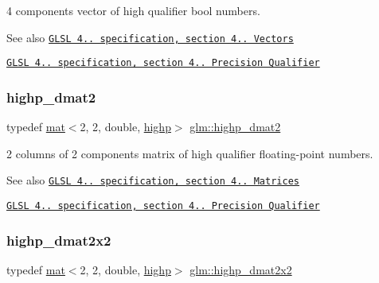 4 components vector of high qualifier bool numbers.

\begin{DoxySeeAlso}{See also}
\href{http://www.opengl.org/registry/doc/GLSLangSpec.4.20.8.pdf}{\tt G\+L\+SL 4.. specification, section 4.. Vectors} 

\href{http://www.opengl.org/registry/doc/GLSLangSpec.4.20.8.pdf}{\tt G\+L\+SL 4.. specification, section 4.. Precision Qualifier} 
\end{DoxySeeAlso}
\mbox{\label{group__core__precision_ga10defb0dfd989f948d6783e2ca3889d3}} 
\subsubsection{\texorpdfstring{highp\+\_\+dmat2}{highp\_dmat2}}
{\footnotesize\ttfamily typedef \mbox{\hyperlink{structglm_1_1mat}{mat}}$<$2, 2, double, \mbox{\hyperlink{namespaceglm_a36ed105b07c7746804d7fdc7cc90ff25ac6f7eab42eacbb10d59a58e95e362074}{highp}}$>$ \mbox{\hyperlink{group__core__precision_ga10defb0dfd989f948d6783e2ca3889d3}{glm\+::highp\+\_\+dmat2}}}

2 columns of 2 components matrix of high qualifier floating-\/point numbers.

\begin{DoxySeeAlso}{See also}
\href{http://www.opengl.org/registry/doc/GLSLangSpec.4.20.8.pdf}{\tt G\+L\+SL 4.. specification, section 4.. Matrices} 

\href{http://www.opengl.org/registry/doc/GLSLangSpec.4.20.8.pdf}{\tt G\+L\+SL 4.. specification, section 4.. Precision Qualifier} 
\end{DoxySeeAlso}
\mbox{\label{group__core__precision_gad08aec6bf6b5ae7d486fbabb3b28f904}} 
\subsubsection{\texorpdfstring{highp\+\_\+dmat2x2}{highp\_dmat2x2}}
{\footnotesize\ttfamily typedef \mbox{\hyperlink{structglm_1_1mat}{mat}}$<$2, 2, double, \mbox{\hyperlink{namespaceglm_a36ed105b07c7746804d7fdc7cc90ff25ac6f7eab42eacbb10d59a58e95e362074}{highp}}$>$ \mbox{\hyperlink{group__core__precision_gad08aec6bf6b5ae7d486fbabb3b28f904}{glm\+::highp\+\_\+dmat2x2}}}

